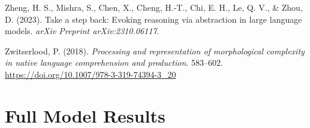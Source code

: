 \documentclass[
  12pt,
  letterpaper,
]{scrreport}
\newlength{\cslhangindent}
\newenvironment{CSLReferences}[2] %
 {\begin{list}{}{%
  \setlength{\itemindent}{0pt}
  \setlength{\leftmargin}{0pt}
  \setlength{\parsep}{0pt}
  \ifodd #1
   \setlength{\leftmargin}{\cslhangindent}
   \setlength{\itemindent}{-1\cslhangindent}
  \fi
  \setlength{\itemsep}{#2\baselineskip}}}
 {\end{list}}
\begin{document}
\begin{CSLReferences}{1}{0}
Zheng, H. S., Mishra, S., Chen, X., Cheng, H.-T., Chi, E. H., Le, Q. V.,
\& Zhou, D. (2023). Take a step back: Evoking reasoning via abstraction
in large language models. \emph{arXiv Preprint arXiv:2310.06117}.

Zwitserlood, P. (2018). \emph{Processing and representation of
morphological complexity in native language comprehension and
production}. 583--602.
\url{https://doi.org/10.1007/978-3-319-74394-3_20}

\end{CSLReferences}

\endgroup

\cleardoublepage
{}
{}
\appendix

\chapter{Full Model Results}\label{sec-full-model-results}
\end{document}
